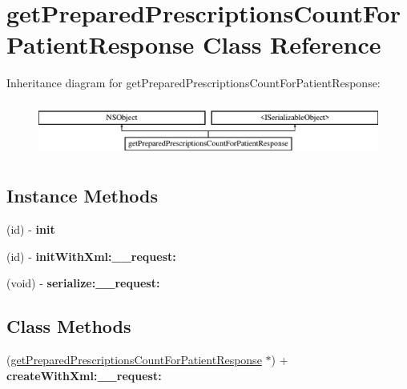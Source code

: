 \hypertarget{interfaceget_prepared_prescriptions_count_for_patient_response}{}\section{get\+Prepared\+Prescriptions\+Count\+For\+Patient\+Response Class Reference}
\label{interfaceget_prepared_prescriptions_count_for_patient_response}
Inheritance diagram for get\+Prepared\+Prescriptions\+Count\+For\+Patient\+Response\+:\begin{figure}[H]
\begin{center}
\leavevmode
\includegraphics[height=1.806452cm]{interfaceget_prepared_prescriptions_count_for_patient_response}
\end{center}
\end{figure}
\subsection*{Instance Methods}
\begin{DoxyCompactItemize}
\item 
\hypertarget{interfaceget_prepared_prescriptions_count_for_patient_response_a216c780bd8698ed230c681603e274d0d}{}(id) -\/ {\bfseries init}\label{interfaceget_prepared_prescriptions_count_for_patient_response_a216c780bd8698ed230c681603e274d0d}

\item 
\hypertarget{interfaceget_prepared_prescriptions_count_for_patient_response_a615789844e6622b78bf5613800bf209b}{}(id) -\/ {\bfseries init\+With\+Xml\+:\+\_\+\+\_\+request\+:}\label{interfaceget_prepared_prescriptions_count_for_patient_response_a615789844e6622b78bf5613800bf209b}

\item 
\hypertarget{interfaceget_prepared_prescriptions_count_for_patient_response_aa538dda7744b446d000e0d23013d55ee}{}(void) -\/ {\bfseries serialize\+:\+\_\+\+\_\+request\+:}\label{interfaceget_prepared_prescriptions_count_for_patient_response_aa538dda7744b446d000e0d23013d55ee}

\end{DoxyCompactItemize}
\subsection*{Class Methods}
\begin{DoxyCompactItemize}
\item 
\hypertarget{interfaceget_prepared_prescriptions_count_for_patient_response_a300e3092e3685bbc7627546ec2b48f5f}{}(\hyperlink{interfaceget_prepared_prescriptions_count_for_patient_response}{get\+Prepared\+Prescriptions\+Count\+For\+Patient\+Response} $\ast$) + {\bfseries create\+With\+Xml\+:\+\_\+\+\_\+request\+:}\label{interfaceget_prepared_prescriptions_count_for_patient_response_a300e3092e3685bbc7627546ec2b48f5f}

\end{DoxyCompactItemize}
